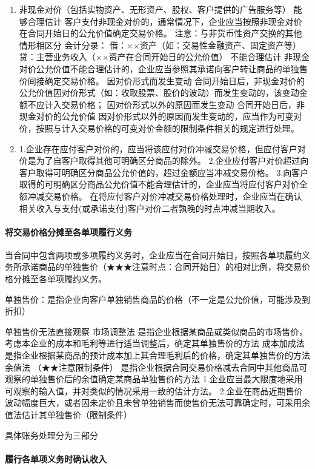 \documentclass[UTF8,12pt]{ctexart}
\numberwithin{equation}{section} %
\numberwithin{figure}{section}
\numberwithin{table}{section}
\begin{document}
\begin{enumerate}
		\item 非现金对价（包括实物资产、无形资产、股权、客户提供的广告服务等）
		能够合理估计	客户支付非现金对价的，通常情况下，企业应当按照非现金对价在合同开始日的公允价值确定交易价格。
		注意：与非货币性资产交换的其他情形相区分
		会计分录：
		借：××资产（如：交易性金融资产、固定资产等）
		贷：主营业务收入（××资产在合同开始日的公允价值）
		不能合理估计	非现金对价公允价值不能合理估计的，企业应当参照其承诺向客户转让商品的单独售价间接确定交易价格。
		因对价形式而发生变动	合同开始日后，非现金对价的公允价值因对价形式（如：收取股票、股价的波动）而发生变动的，该变动金额不应计入交易价格；
		因对价形式以外的原因而发生变动	合同开始日后，非现金对价的公允价值
		因对价形式以外的原因而发生变动的，应当作为可变对价，按照与计入交易价格的可变对价金额的限制条件相关的规定进行处理。
		
		\item 1.企业存在应付客户对价的，应当将该应付对价冲减交易价格，但应付客户对价是为了自客户取得其他可明确区分商品的除外。
		2.企业应付客户对价超过向客户取得可明确区分商品公允价值的，超过金额应当冲减交易价格。
		3.向客户取得的可明确区分商品公允价值不能合理估计的，企业应当将应付客户对价全额冲减交易价格。
		在将应付客户对价冲减交易价格处理时，企业应当在确认相关收入与支付(或承诺支付)客户对价二者孰晚的时点冲减当期收入。
		
	\end{enumerate}
	\paragraph{将交易价格分摊至各单项履行义务}
	当合同中包含两项或多项履约义务时，企业应当在合同开始日，按照各单项履约义务所承诺商品的单独售价（★★★注意时点：合同开始日）的相对比例，将交易价格分摊至各单项履约义务。
	
	单独售价：是指企业向客户单独销售商品的价格（不一定是公允价值，可能涉及到折扣）
	
	单独售价无法直接观察	市场调整法	是指企业根据某商品或类似商品的市场售价，考虑本企业的成本和毛利等进行适当调整后，确定其单独售价的方法
	成本加成法	是指企业根据某商品的预计成本加上其合理毛利后的价格，确定其单独售价的方法
	余值法
	（★★注意限制条件）	是指企业根据合同交易价格减去合同中其他商品可观察的单独售价后的余值确定某商品单独售价的方法
	1.企业应当最大限度地采用可观察的输入值，并对类似的情况采用一致的估计方法。
	2.企业在商品近期售价波动幅度巨大，或者因未定价且未曾单独销售而使售价无法可靠确定时，可采用余值法估计其单独售价（限制条件）
	
	具体账务处理分为三部分
	\paragraph{履行各单项义务时确认收入}
	
\end{document}
